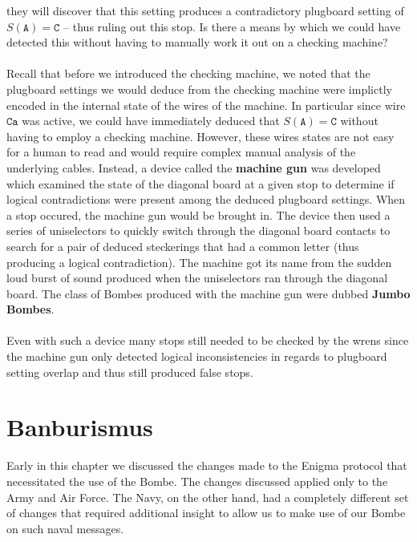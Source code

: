 they will discover that this setting produces a contradictory
plugboard setting of $S(\texttt{A}) = \texttt{C}$ -- thus ruling out
this stop. Is there a means by which we could have detected this
without having to manually work it out on a checking machine?
\\\\Recall that before we introduced the checking machine, we noted
that the plugboard settings we would deduce from the checking machine
were implictly encoded in the internal state of the wires of the
machine. In particular since wire $\texttt{Ca}$ was active, we could
have immediately deduced that $S(\texttt{A})= \texttt{C}$ without
having to employ a checking machine. However, these wires states are
not easy for a human to read and would require complex manual
analysis of the underlying cables. Instead, a device called the
	{\bf{machine gun}} was developed which examined the state of the
diagonal board at a given stop to determine if logical contradictions
were present among the deduced plugboard settings. When a stop
occured, the machine gun would be brought in. The device then used a
series of uniselectors to quickly switch through the diagonal board
contacts to search for a pair of deduced steckerings that had a
common letter (thus producing a logical contradiction). The machine
got its name from the sudden loud burst of sound produced when the
uniselectors ran through the diagonal board. The class of Bombes produced with the machine gun were dubbed {\bf{Jumbo Bombes}}.
\\\\Even with such a device many stops still needed to be checked by
the wrens since the machine gun only detected logical inconsistencies
in regards to plugboard setting overlap and thus still produced false stops.

\section{Banburismus}
Early in this chapter we discussed the changes made to the Enigma
protocol that necessitated the use of the Bombe. The changes
discussed applied only to the Army and Air Force. The Navy, on the
other hand, had a completely different set of changes that required
additional insight to allow us to make use of our Bombe on such naval messages.

